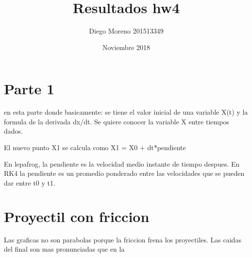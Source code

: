 \documentclass{article}
\title{Resultados hw4}
\author{Diego Moreno 201513349 }
\date{Noviembre 2018}
\begin{document}
\maketitle

\section{Parte 1  }
en esta parte donde basicamente: se tiene el valor inicial de una variable X(t)
y la formula de la derivada dx/dt. Se quiere conocer la variable X entre tiempos dados.

El nuevo punto X1 se calcula como
X1 = X0 + dt*pendiente

En lepafrog, la pendiente es la velocidad medio instante de tiempo despues. 
En RK4 la pendiente es un promedio ponderado entre las velocidades que se pueden dar entre t0 y t1.

\section{ Proyectil con friccion}
Las graficas no son parabolas porque la friccion frena los proyectiles. Las caidas del final son mas pronunciadas que en la
\end{document}
